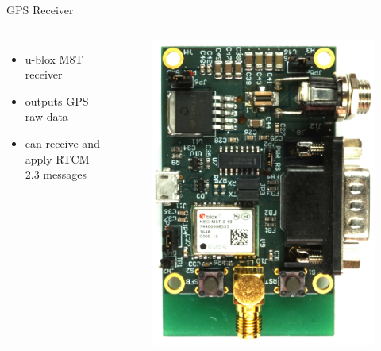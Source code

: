 \documentclass[12pt, compress, xcolor=table]{beamer}
\begin{document}
\begin{frame}{GPS Receiver}
 \begin{columns}
  
  \begin{itemize}
   \setlength\itemsep{0.5cm}
   \item u-blox M8T receiver
   \item outputs GPS raw data
   \item can receive and apply RTCM 2.3 messages
  \end{itemize}
  
  \begin{figure}
   \centering
   \includegraphics[width=\textwidth]{images/M8T_Receiver_Board.jpg}
  \end{figure}
  
 \end{columns}
\end{frame}
\end{document}
